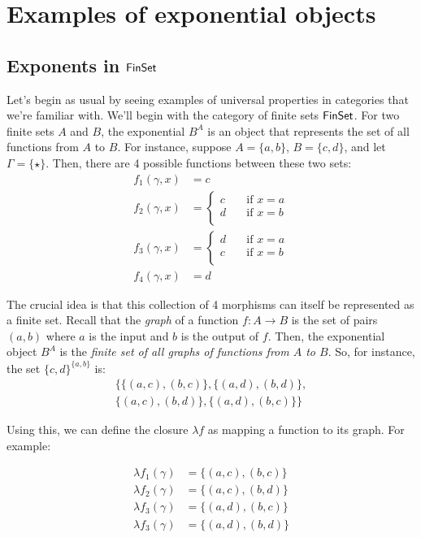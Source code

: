 \section{Examples of exponential objects}

\subsection{Exponents in $\mathsf{FinSet}{}$}
Let's begin as usual by seeing examples of universal properties in categories
that we're familiar with. We'll begin with the category of finite sets $\mathsf{FinSet}$.
For two finite sets $A$ and $B$, the exponential $B^A$ is an object that
represents the set of all functions from $A$ to $B$.
For instance, suppose $A = \{a, b\}$, $B = \{c, d\}$,
and let $\Gamma = \{\star\}$.
Then, there are 4 possible functions between these two sets:
\begin{align*}
  f_1(\gamma, x) &= c\\
  f_2(\gamma, x) &=
  \begin{cases}
    c \quad& \text{if }x = a\\
    d \quad& \text{if }x = b\\
  \end{cases}\\
  f_3(\gamma, x) &=
  \begin{cases}
    d \quad& \text{if }x = a\\
    c \quad& \text{if }x = b\\
  \end{cases}\\
  f_4(\gamma, x) &= d
\end{align*}

The crucial idea is that this collection of 4 morphisms can itself
be represented as a finite set.
Recall that the \emph{graph} of a function $f : A \to B$
is the set of pairs $(a, b)$ where $a$ is the input and $b$ is the output
of $f$. Then, the exponential object $B^A$ is the \emph{finite
set of all graphs of functions from $A$ to $B$}.
So, for instance, the set $\{c,d\}^{\{a, b\}}$ is:
  \begin{align*}
    \Big\{\{(a, c), (b, c)\}, \{(a, d), (b, d)\}, \\
    \{(a, c), (b, d)\}, \{(a, d), (b, c)\}\Big\}
  \end{align*}

Using this, we can define the closure $\lambda f$ as mapping a
function to its graph. For example:

\begin{align*}
  \lambda f_1(\gamma) &= \{(a, c), (b, c)\} \\
  \lambda f_2(\gamma) &= \{(a, c), (b, d)\} \\
  \lambda f_3(\gamma) &= \{(a, d), (b, c)\} \\
  \lambda f_3(\gamma) &= \{(a, d), (b, d)\}
\end{align*}

